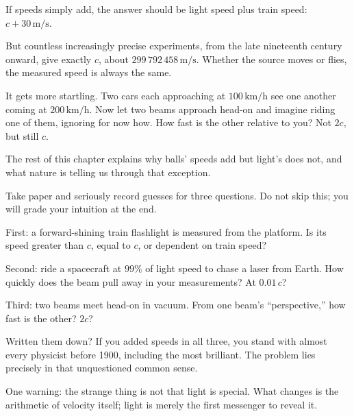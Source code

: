 If speeds simply add, the answer should be light speed plus train speed: \(c+30\,\mathrm{m/s}\).

But countless increasingly precise experiments, from the late nineteenth century onward, give exactly \(c\), about \(299\,792\,458\,\mathrm{m/s}\). Whether the source moves or flies, the measured speed is always the same.

It gets more startling. Two cars each approaching at \(100\,\mathrm{km/h}\) see one another coming at \(200\,\mathrm{km/h}\). Now let two beams approach head-on and imagine riding one of them, ignoring for now how. How fast is the other relative to you? Not \(2c\), but still \(c\).

The rest of this chapter explains why balls' speeds add but light's does not, and what nature is telling us through that exception.


Take paper and seriously record guesses for three questions. Do not skip this; you will grade your intuition at the end.

First: a forward-shining train flashlight is measured from the platform. Is its speed greater than \(c\), equal to \(c\), or dependent on train speed?

Second: ride a spacecraft at \(99\%\) of light speed to chase a laser from Earth. How quickly does the beam pull away in your measurements? At \(0.01\,c\)?

Third: two beams meet head-on in vacuum. From one beam's ``perspective,'' how fast is the other? \(2c\)?

Written them down? If you added speeds in all three, you stand with almost every physicist before 1900, including the most brilliant. The problem lies precisely in that unquestioned common sense.

One warning: the strange thing is not that light is special. What changes is the arithmetic of velocity itself; light is merely the first messenger to reveal it.



